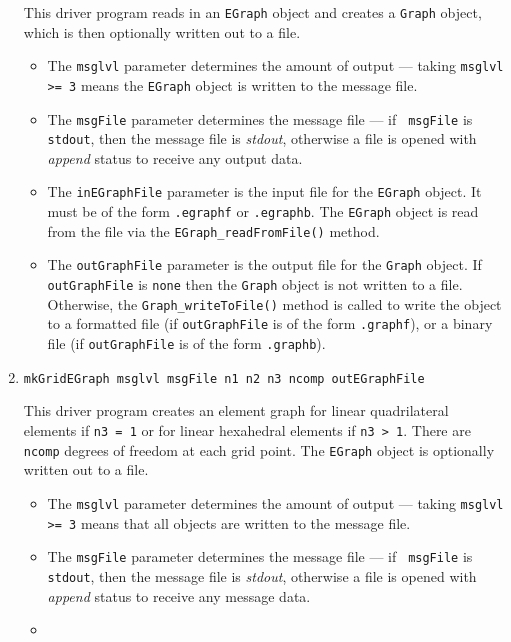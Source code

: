 \begin{enumerate}
\begin{verbatim}
\end{verbatim}
This driver program reads in an {\tt EGraph} object and creates a
{\tt Graph} object, which is then optionally written out to a file.
\par
\begin{itemize}
\item
The {\tt msglvl} parameter determines the amount of output ---
taking {\tt msglvl >= 3} means the {\tt EGraph} object is written
to the message file.
\item
The {\tt msgFile} parameter determines the message file --- if {\tt
msgFile} is {\tt stdout}, then the message file is {\it stdout},
otherwise a file is opened with {\it append} status to receive any
output data.
\item
The {\tt inEGraphFile} parameter is the input file for the {\tt EGraph}
object. It must be of the form {\tt *.egraphf} or {\tt *.egraphb}.
The {\tt EGraph} object is read from the file via the
{\tt EGraph\_readFromFile()} method.
\item
The {\tt outGraphFile} parameter is the output file for the 
{\tt Graph} object. 
If {\tt outGraphFile} is {\tt none} then the {\tt Graph} object is not
written to a file. 
Otherwise, the {\tt Graph\_writeToFile()} method is called to write
the object to 
a formatted file (if {\tt outGraphFile} is of the form 
{\tt *.graphf}),
or
a binary file (if {\tt outGraphFile} is of the form {\tt *.graphb}).
\end{itemize}
\item
\begin{verbatim}
mkGridEGraph msglvl msgFile n1 n2 n3 ncomp outEGraphFile 
\end{verbatim}
This driver program creates an element graph for linear
quadrilateral elements if {\tt n3 = 1} or for linear hexahedral
elements if {\tt n3 > 1}.
There are {\tt ncomp} degrees of freedom at each grid point.
The {\tt EGraph} object is optionally written out to a file.
\begin{itemize}
\item
The {\tt msglvl} parameter determines the amount of output ---
taking {\tt msglvl >= 3} means that all objects are written
to the message file.
\item
The {\tt msgFile} parameter determines the message file --- if {\tt
msgFile} is {\tt stdout}, then the message file is {\it stdout},
otherwise a file is opened with {\it append} status to receive any
message data.
\item

\end{itemize}
\end{enumerate}
